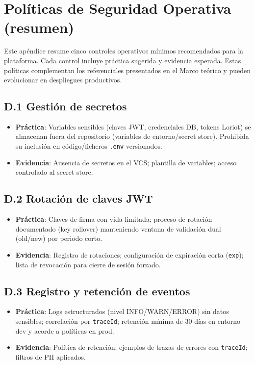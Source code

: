 \documentclass[12pt,a4paper,oneside]{report}
\begin{document}
\chapter{Políticas de Seguridad Operativa (resumen)}
\label{apendice:seguridad-operativa}

Este apéndice resume cinco controles operativos mínimos recomendados para la plataforma. Cada control incluye práctica sugerida y evidencia esperada. Estas políticas complementan los referenciales presentados en el Marco teórico y pueden evolucionar en despliegues productivos.

\section*{D.1 Gestión de secretos}
\begin{itemize}
  \item \textbf{Práctica}: Variables sensibles (claves JWT, credenciales DB, tokens Loriot) se almacenan fuera del repositorio (variables de entorno/secret store). Prohibida su inclusión en código/ficheros \texttt{.env} versionados.
  \item \textbf{Evidencia}: Ausencia de secretos en el VCS; plantilla de variables; acceso controlado al secret store.
\end{itemize}

\section*{D.2 Rotación de claves JWT}
\begin{itemize}
  \item \textbf{Práctica}: Claves de firma con vida limitada; proceso de rotación documentado (key rollover) manteniendo ventana de validación dual (old/new) por periodo corto.
  \item \textbf{Evidencia}: Registro de rotaciones; configuración de expiración corta (\texttt{exp}); lista de revocación para cierre de sesión forzado.
\end{itemize}

\section*{D.3 Registro y retención de eventos}
\begin{itemize}
  \item \textbf{Práctica}: Logs estructurados (nivel INFO/WARN/ERROR) sin datos sensibles; correlación por \texttt{traceId}; retención mínima de 30 días en entorno dev y acorde a políticas en prod.
  \item \textbf{Evidencia}: Política de retención; ejemplos de trazas de errores con \texttt{traceId}; filtros de PII aplicados.
\end{itemize}
\end{document}
